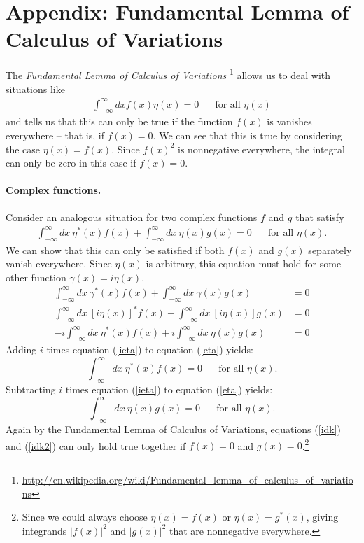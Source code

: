 \documentclass[11pt]{article}
\renewcommand{\sp}{\ensuremath{\ \ \ \ \ \ }}
\theoremstyle{indented}
\begin{document}
\newpage
\section{Appendix: Fundamental Lemma of Calculus of Variations}
\label{flcv}
The {\it Fundamental Lemma of Calculus of Variations} \footnote{\url{http://en.wikipedia.org/wiki/Fundamental_lemma_of_calculus_of_variations}} allows us to deal with situations like
\begin{align}
	\int_{-\infty}^\infty dx f(x)\eta(x)
=
	0
\sp\text{ for all $\eta(x)$}
\end{align}
and tells us that this can only be true if the function $f(x)$ is vanishes everywhere -- that is, if $f(x)=0$.
We can see that this is true by considering the case $\eta(x)=f(x)$.
Since $f(x)^2$ is nonnegative everywhere, the integral can only be zero in this case if $f(x)=0$.

\paragraph{Complex functions.}
Consider an analogous situation for two complex functions $f$ and $g$ that satisfy
\begin{align}
\label{eta}
\int_{-\infty}^\infty dx\
	\eta^*(x)f(x)
+\int_{-\infty}^\infty dx\
	\eta(x)g(x)
=
	0
\sp\text{ for all $\eta(x)$.}
\end{align}
We can show that this can only be satisfied if both $f(x)$ and $g(x)$ separately vanish everywhere. Since $\eta(x)$ is arbitrary, this equation must hold for some other function $\gamma(x) = i \eta(x)$.
\begin{align}
\int_{-\infty}^\infty dx\
	\gamma^*(x)f(x)
+\int_{-\infty}^\infty dx\
	\gamma(x)g(x)
&=
	0
\\[1ex]
\int_{-\infty}^\infty dx\
	[i \eta(x) ]^* f(x)
+\int_{-\infty}^\infty dx\
	[i \eta(x)] g(x)
&=
	0
\\[1ex]
   \label{ieta}
    -i 
    \int_{-\infty}^\infty dx\
	\eta^*(x)  f(x)
+ 
    i \int_{-\infty}^\infty dx\
	\eta(x) g(x)
&=
	0
\end{align}
Adding $i$ times equation (\ref{ieta}) to equation (\ref{eta}) yields:
\begin{equation}
   \label{idk}
	\int_{-\infty}^\infty dx\ 
	\eta^*(x)f(x)=0
\sp\text{ for all $\eta(x)$.}
\end{equation}
Subtracting $i$ times equation (\ref{ieta}) to equation (\ref{eta}) yields:
\begin{equation}
   \label{idk2}
	\int_{-\infty}^\infty dx\ \eta(x)g(x)=0
\sp\text{ for all $\eta(x)$.}
\end{equation}
Again by the Fundamental Lemma of Calculus of Variations, equations (\ref{idk}) and (\ref{idk2}) can only hold true together if $f(x)=0$ and $g(x)=0$.\footnote{Since we could always choose $\eta(x)=f(x)$ or $\eta(x)=g^*(x)$, giving integrands $|f(x)|^2$ and $|g(x)|^2$ that are nonnegative everywhere.}
\end{document}
